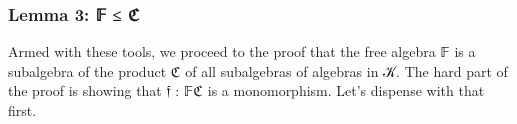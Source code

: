 \subsubsection{Lemma 3: 𝔽 ≤ ℭ}\label{lemma-3-ux1d53d-ux212d}
Armed with these tools, we proceed to the proof that the free algebra \af 𝔽 is a subalgebra of the product \af ℭ of all subalgebras of algebras in \ab 𝒦. The hard part of the proof is showing that \af 𝔣 \as :  \af 𝔽\af ℭ is a monomorphism. Let's dispense with that first.
\ccpad
\begin{code}%
\>[1]\AgdaSpace{}%
\AgdaSymbol{:}\AgdaSpace{}%
\AgdaSpace{}%
\AgdaSpace{}%
\AgdaSpace{}%
\AgdaSpace{}%
\AgdaSpace{}%
\AgdaSymbol{(}\AgdaSpace{}%
\AgdaSymbol{)}\<%
\\
%
\>[1]\AgdaSpace{}%
\AgdaSymbol{=}\AgdaSpace{}%
\AgdaSpace{}%
\<%
\\
%
\\[\AgdaEmptyExtraSkip]%
%
\>[1]\AgdaSpace{}%
\AgdaSymbol{:}\AgdaSpace{}%
\AgdaSpace{}%
\AgdaSpace{}%
\AgdaSpace{}%
\<%
\\
%
\>[1]\AgdaSpace{}%
\AgdaSymbol{(}\AgdaSpace{}%
\AgdaDottedPattern{\AgdaSymbol{)}}\AgdaSpace{}%
\AgdaOperator{\AgdaInductiveConstructor{,}}\AgdaSpace{}%
\AgdaSpace{}%
\AgdaOperator{\AgdaInductiveConstructor{,}}\AgdaSpace{}%
\AgdaSpace{}%
\AgdaSymbol{\AgdaUnderscore{})}\AgdaSpace{}%
\AgdaSymbol{(}\AgdaSpace{}%
\AgdaDottedPattern{\AgdaSymbol{)}}\AgdaSpace{}%
\AgdaOperator{\AgdaInductiveConstructor{,}}\AgdaSpace{}%
\AgdaSpace{}%
\AgdaOperator{\AgdaInductiveConstructor{,}}\AgdaSpace{}%
\AgdaSpace{}%
\AgdaSymbol{\AgdaUnderscore{})}\AgdaSpace{}%
\AgdaSpace{}%
\AgdaSymbol{=}\AgdaSpace{}%
\<%
\\
\>[1][@{}l@{\AgdaIndent{0}}]%
\>[2]\<%
\\
%
\\[\AgdaEmptyExtraSkip]%
\>[2][@{}l@{\AgdaIndent{0}}]%
\>[3]\AgdaSpace{}%

\end{code}
